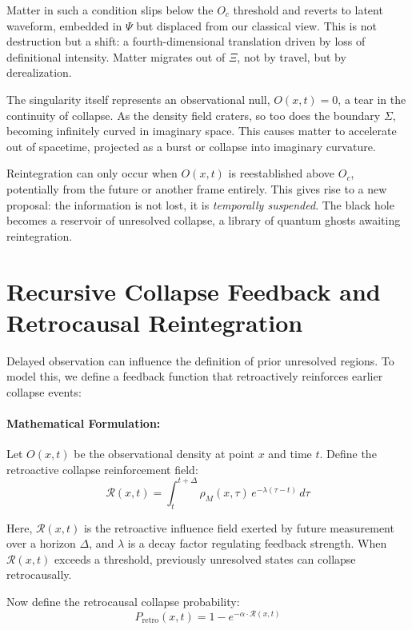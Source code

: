 Matter in such a condition slips below the \( O_c \) threshold and reverts to latent waveform, embedded in \( \Psi \) but displaced from our classical view. This is not destruction but a shift: a fourth-dimensional translation driven by loss of definitional intensity. Matter migrates out of \( \Xi \), not by travel, but by derealization.

The singularity itself represents an observational null, \( O(x,t) = 0 \), a tear in the continuity of collapse. As the density field craters, so too does the boundary \( \Sigma \), becoming infinitely curved in imaginary space. This causes matter to accelerate out of spacetime, projected as a burst or collapse into imaginary curvature.

Reintegration can only occur when \( O(x,t) \) is reestablished above \( O_c \), potentially from the future or another frame entirely. This gives rise to a new proposal: the information is not lost, it is \textit{temporally suspended}. The black hole becomes a reservoir of unresolved collapse, a library of quantum ghosts awaiting reintegration.

\section{Recursive Collapse Feedback and Retrocausal Reintegration}
Delayed observation can influence the definition of prior unresolved regions. To model this, we define a feedback function that retroactively reinforces earlier collapse events:

\paragraph{Mathematical Formulation:} \cite{observer_geometry_framework}

Let $O(x,t)$ be the observational density at point $x$ and time $t$. Define the retroactive collapse reinforcement field:
\begin{equation}
\mathcal{R}(x,t) = \int_t^{t+\Delta} \rho_M(x,\tau) \, e^{-\lambda (\tau - t)} \, d\tau
\end{equation}

Here, $\mathcal{R}(x,t)$ is the retroactive influence field exerted by future measurement over a horizon $\Delta$, and $\lambda$ is a decay factor regulating feedback strength. When $\mathcal{R}(x,t)$ exceeds a threshold, previously unresolved states can collapse retrocausally.

Now define the retrocausal collapse probability:
\begin{equation}
P_{\text{retro}}(x,t) = 1 - e^{-\alpha \cdot \mathcal{R}(x,t)}
\end{equation}

